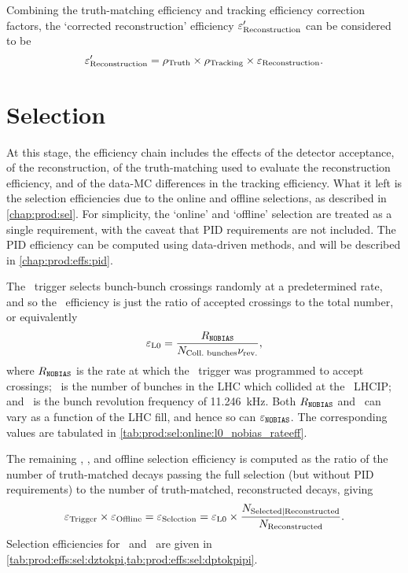 Combining the truth-matching efficiency and tracking efficiency correction 
factors, the `corrected reconstruction' efficiency $\varepsilon_{\textnormal{Reconstruction}}'$ can be 
considered to be
\begin{equation}
  \varepsilon_{\textnormal{Reconstruction}}' = \rho_{\textnormal{Truth}}\times\rho_{\textnormal{Tracking}}\times\varepsilon_{\textnormal{Reconstruction}}.
  \label{eqn:prod:effs:reco_corrected}
\end{equation}

\section{Selection}
\label{chap:prod:effs:sel}

At this stage, the efficiency chain includes the effects of the detector 
acceptance, of the reconstruction, of the truth-matching used to evaluate the 
reconstruction efficiency, and of the data-\ac{MC} differences in the tracking 
efficiency.
What it left is the selection efficiencies due to the online and offline 
selections, as described in \cref{chap:prod:sel}.
For simplicity, the `online' and `offline' selection are treated as a single 
requirement, with the caveat that \ac{PID} requirements are not included.
The \ac{PID} efficiency can be computed using data-driven methods, and will be 
described in \cref{chap:prod:effs:pid}.

The \lzero\ trigger selects bunch-bunch crossings randomly at a predetermined 
rate, and so the \lzero\ efficiency is just the ratio of accepted crossings to 
the total number, or equivalently
\begin{equation}
  \efflzero = \frac{%
    R_{\nobias}
  }{%
    \ncollbunches\revfreq
  },
  \label{eqn:prod:effs:sel:l0}
\end{equation}
where $R_{\texttt{NOBIAS}}$ is the rate at which the \lzero\ trigger was programmed to 
accept crossings; \ncollbunches\ is the number of bunches in the \ac{LHC} which 
collided at the \lhcb\ \acl{LHCIP}; and \revfreq\ is the bunch revolution 
frequency of \SI{11.246}{\kilo\hertz}.
Both $R_{\texttt{NOBIAS}}$ and \ncollbunches\ can vary as a function of the \ac{LHC} 
fill, and hence so can $\varepsilon_{\texttt{NOBIAS}}$.
The corresponding values are tabulated in 
\cref{tab:prod:sel:online:l0_nobias_rateeff}.

The remaining \hltone, \hlttwo, and offline selection efficiency is computed as 
the ratio of the number of truth-matched decays passing the full selection (but 
without \ac{PID} requirements) to the number of truth-matched, reconstructed 
decays, giving
\begin{equation}
  \efftrig \times \effoffline = \effselection = \efflzero \times \frac{%
    N_{\text{Selected}|\text{Reconstructed}}
  }{%
    N_{\text{Reconstructed}}
  }.
  \label{eqn:prod:effs:sel}
\end{equation}
Selection efficiencies for \DzToKpi\ and \DpToKpipi\ are given in 
\cref{tab:prod:effs:sel:dztokpi,tab:prod:effs:sel:dptokpipi}.

